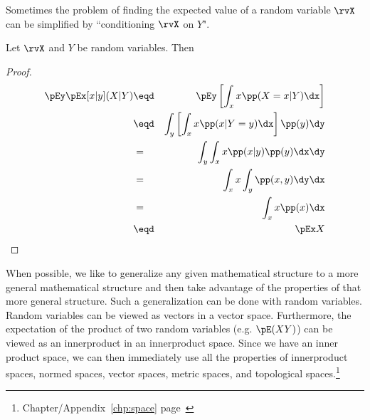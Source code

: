 Sometimes the problem of finding the expected value of a random variable $\rvX$
can be simplified by ``conditioning $\rvX$ on $Y$".
\begin{theorem}
Let $\rvX$ and $Y$ be random variables. Then
\end{theorem}
\begin{proof}
\begin{eqnarray*}
   \pEy\pEx[x|y](X|Y)
     &\eqd& \pEy \left[ \int_x x \pp(X=x|Y) \dx \right]
   \\&\eqd& \int_y \left[\int_x x \pp(x|Y=y) \dx \right] \pp(y) \dy
   \\&=&    \int_y \int_x x \pp(x|y)\pp(y) \dx   \dy
   \\&=&    \int_x x \int_y \pp(x,y) \dy   \dx
   \\&=&    \int_x x \pp(x) \dx
   \\&\eqd& \pEx X
\end{eqnarray*}
\end{proof}




When possible, we like to generalize any given mathematical structure
to a more general mathematical structure and then take advantage of
the properties of that more general structure.
Such a generalization can be done with random variables.
Random variables can be viewed as vectors in a vector space.
Furthermore, the expectation of the product of two random variables
(e.g. $\pE(XY)$)
can be viewed as an innerproduct in an innerproduct space.
Since we have an inner product space,
we can then immediately use all the properties of
innerproduct spaces, normed spaces, vector spaces, metric spaces,
and topological spaces.\footnote{
   Chapter/Appendix~\ref{chp:space} page~\pageref{chp:space}
  }




